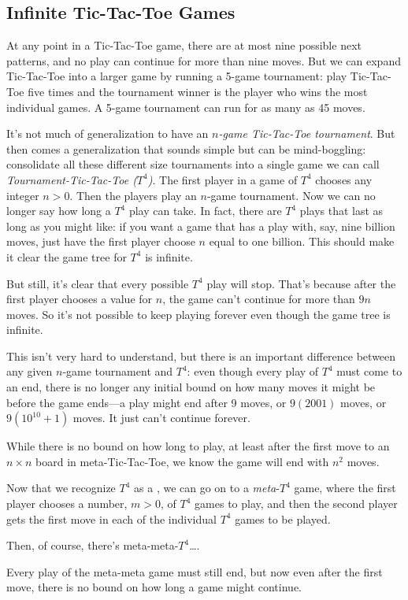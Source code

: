 \begin{editingnotes}
\subsection{Infinite Tic-Tac-Toe Games}
At any point in a Tic-Tac-Toe game, there are at most nine possible
next patterns, and no play can continue for more than nine moves.  But
we can expand Tic-Tac-Toe into a larger game by running a 5-game
tournament: play Tic-Tac-Toe five times and the tournament winner is
the player who wins the most individual games.  A 5-game tournament
can run for as many as 45 moves.

It's not much of generalization to have an \emph{$n$-game Tic-Tac-Toe
  tournament}.  But then comes a generalization that sounds simple but can
be mind-boggling: consolidate all these different size tournaments into a
single game we can call \emph{Tournament-Tic-Tac-Toe ($T^4$)}.  The first
player in a game of $T^4$ chooses any integer $n > 0$.  Then the players
play an $n$-game tournament.  Now we can no longer say how long a $T^4$
play can take.  In fact, there are $T^4$ plays that last as long as you
might like: if you want a game that has a play with, say, nine billion
moves, just have the first player choose $n$ equal to one billion.  This
should make it clear the game tree for $T^4$ is infinite.

But still, it's clear that every possible $T^4$ play will stop.
That's because after the first player chooses a value for $n$, the
game can't continue for more than $9n$ moves.  So it's not possible to
keep playing forever even though the game tree is infinite.

This isn't very hard to understand, but there is an important
difference between any given $n$-game tournament and $T^4$: even
though every play of $T^4$ must come to an end, there is no longer any
initial bound on how many moves it might be before the game ends---a
play might end after 9 moves, or $9(2001)$ moves, or $9(10^{10}+1)$
moves.  It just can't continue forever.

While there is no bound on how long to play, at least after the
first move to an $n \times n$ board in meta-Tic-Tac-Toe, we know the game
will end with $n^2$ moves.

Now that we recognize $T^4$ as a \tg, we can go on to
a \emph{meta}-$T^4$ game, where the first player chooses a number,
$m>0$, of $T^4$ games to play, and then the second player gets the
first move in each of the individual $T^4$ games to be played.

Then, of course, there's meta-meta-$T^4$\dots.

Every play of the meta-meta game must still end, but now even
after the first move, there is no bound on how long a game might
continue.
\end{editingnotes}

